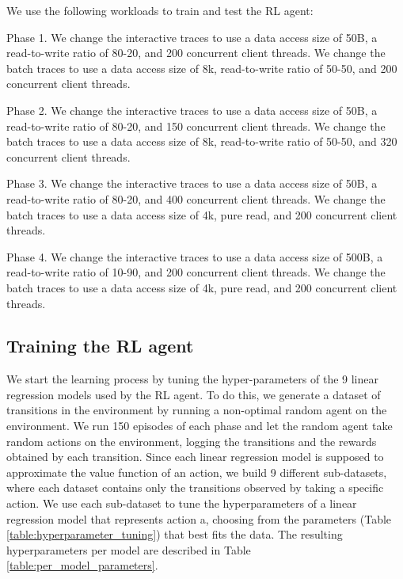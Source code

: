 We use the following workloads to train and test the RL agent:

Phase 1. We change the interactive traces to use a data access size of 50B, a read-to-write ratio of 80-20, and 200 concurrent client threads. We change the batch traces to use a data access size of 8k, read-to-write ratio of 50-50, and 200 concurrent client threads. 

Phase 2. We change the interactive traces to use a data access size of 50B, a read-to-write ratio of 80-20, and 150 concurrent client threads. We change the batch traces to use a data access size of 8k, read-to-write ratio of 50-50, and 320 concurrent client threads.  

Phase 3. We change the interactive traces to use a data access size of 50B, a read-to-write ratio of 80-20, and 400 concurrent client threads. We change the batch traces to use a data access size of 4k, pure read, and 200 concurrent client threads.  

Phase 4. We change the interactive traces to use a data access size of 500B, a read-to-write ratio of 10-90, and 200 concurrent client threads. We change the batch traces to use a data access size of 4k, pure read, and 200 concurrent client threads. 

\subsection{Training the RL agent}

We start the learning process by tuning the hyper-parameters of the 9 linear regression models used by the RL agent. To do this, we generate a dataset of transitions in the environment by running a non-optimal random agent on the environment. We run 150 episodes of each phase and let the random agent take random actions on the environment, logging the transitions and the rewards obtained by each transition. Since each linear regression model is supposed to approximate the value function of an action, we build 9 different sub-datasets, where each dataset contains only the transitions observed by taking a specific action. We use each sub-dataset to tune the hyperparameters of a linear regression model that represents action a, choosing from the parameters (Table \ref{table:hyperparameter_tuning}) that best fits the data. The resulting hyperparameters per model are described in Table \ref{table:per_model_parameters}.

